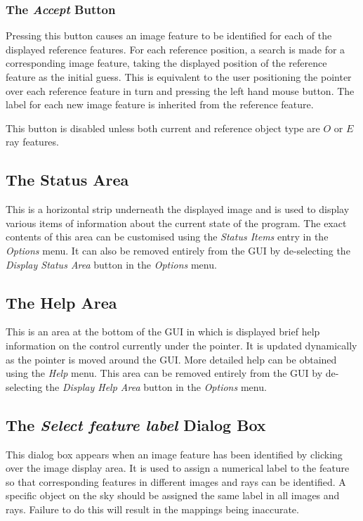 \documentclass[11pt]{article}
\newcommand{\htmlref}[2]{#1}
\newcommand{\xlabel}[1]{}
\newcommand{\mylabel}[1] {\xlabel{#1}\label{#1}}
\begin{document}
\subsubsection {\mylabel{POLKA_ACCEPT}The \emph{Accept} Button}
Pressing this button causes an image feature to be identified for each
of the displayed reference features. For each reference position, a search
is made for a corresponding image feature, taking the displayed position of the
reference feature as the initial guess. This is equivalent to the user
positioning the pointer over each reference feature in turn and pressing
the left hand mouse button. The label for each new image feature is
inherited from the reference feature.

This button is disabled unless both current and reference object type
are $O$ or $E$ ray features.

\subsection {\mylabel{POLKA_STATUS_AREA}The Status Area}
This is a horizontal strip underneath the displayed image and is used to
display various items of information about the current state of the
program. The exact contents of this area can be customised using the
\htmlref{\emph{Status Items}}{POLKA_STATUS_ITEMS} entry in the
\htmlref{\emph{Options}}{POLKA_OPTIONS_MENU} menu. It can also be removed
entirely from the GUI by de-selecting the \htmlref{\emph{Display Status
Area}}{POLKA_DISPLAY_STATUS_AREA} button in the \htmlref{{\em
Options}}{POLKA_OPTIONS_MENU} menu.

\subsection {\mylabel{POLKA_HELP_AREA}The Help Area}
This is an area at the bottom of the GUI in which is displayed brief help
information on the control currently under the pointer. It is updated
dynamically as the pointer is moved around the GUI. More detailed help
can be obtained using the \htmlref{\emph{Help}}{POLKA_HELP_MENU} menu.
This area can be removed entirely from the GUI by de-selecting the
\htmlref{\emph{Display Help Area}}{POLKA_DISPLAY_HELP_AREA} button in the
\htmlref{\emph{Options}}{POLKA_OPTIONS_MENU} menu.

\subsection {\mylabel{POLKA_GET_LABEL_DIALOG}The \emph{Select feature label} Dialog Box}
This dialog box appears when an image feature has been identified by
clicking over the \htmlref{image display area}{POLKA_IMAGE_DISPLAY}. It
is used to assign a numerical label to the feature so that corresponding
features in different images and rays can be identified. A specific object
on the sky should be assigned the same label in all images and rays.
Failure to do this will result in the mappings being inaccurate.
\end{document}
